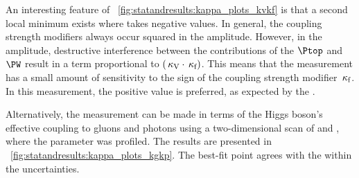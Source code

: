 An interesting feature of \Fig~\ref{fig:statandresults:kappa_plots_kvkf} is that a second local minimum exists where \kf takes negative values. In general, the coupling strength modifiers always occur squared in the amplitude. However, in the \Hgg amplitude, destructive interference between the contributions of the $\Ptop$ and $\PW$ result in a term proportional to $(\,\kappa_\text{V}\cdot\,\kappa_\text{f})$. This means that the measurement has a small amount of sensitivity to the sign of the coupling strength modifier $\,\kappa_\text{f}$. In this measurement, the positive value is preferred, as expected by the \SM. 

%

Alternatively, the measurement can be made in terms of the Higgs boson's effective coupling to gluons and photons using a two-dimensional \DNLL scan of \kGlu and \kPho, where the \mH parameter was profiled. The results are presented in \Fig~\ref{fig:statandresults:kappa_plots_kgkp}. The best-fit point agrees with the \SM within the uncertainties.


